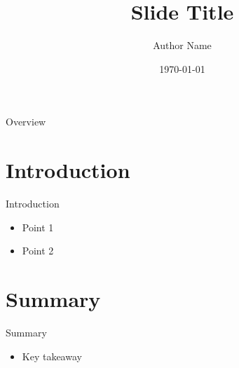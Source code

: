 \documentclass[dvipdfmx,11pt]{beamer}
\title{Slide Title}
\author{Author Name}
\date{\today}
\begin{document}
\begin{frame}
  \titlepage
\end{frame}

\begin{frame}{Overview}
  \tableofcontents
\end{frame}

\section{Introduction}

\begin{frame}{Introduction}
  \begin{itemize}
    \item Point 1
    \item Point 2
  \end{itemize}
\end{frame}

\section{Summary}

\begin{frame}{Summary}
  \begin{itemize}
    \item Key takeaway
  \end{itemize}
\end{frame}
\end{document}
